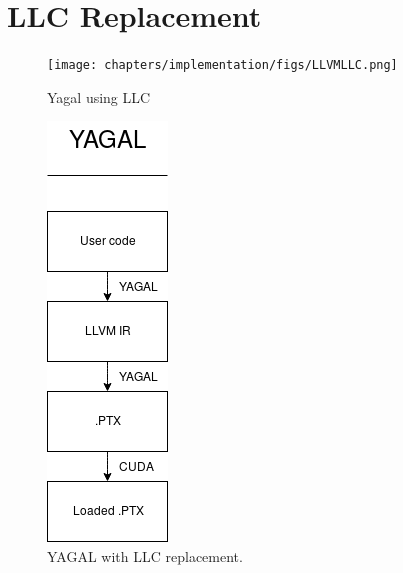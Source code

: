 \section{LLC Replacement}

\begin{figure}[!htb]
    \centering
    \begin{minipage}{.7\textwidth}
        \centering
        \texttt{[image: chapters/implementation/figs/LLVMLLC.png]}
        \caption{Yagal using LLC}
        \label{fig:prob1_6_2}
    \end{minipage}%
    \begin{minipage}{0.4\textwidth}
        \centering
        \includegraphics[width=0.5\linewidth]{chapters/implementation/figs/YAGALLLC.png}
        \caption{YAGAL with LLC replacement.}
        \label{fig:prob1_6_1}
    \end{minipage}
\end{figure}